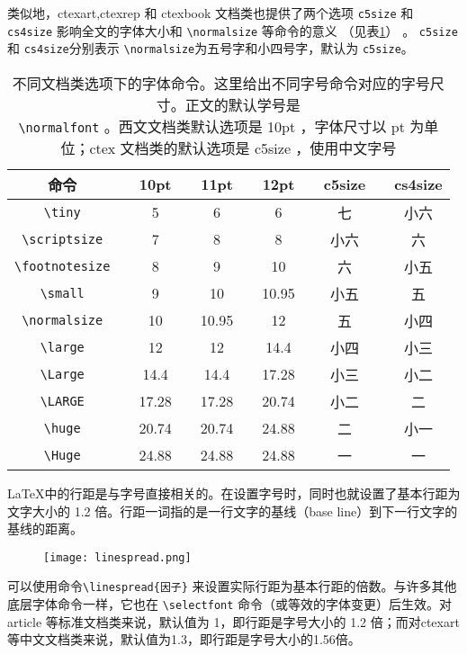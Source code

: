 类似地，ctexart,ctexrep 和 ctexbook 文档类也提供了两个选项 \verb|c5size| 和 \verb|cs4size| 影响全文的字体大小和 \verb|\normalsize| 等命令的意义 （见表\ref{tab:size}） 。 \verb|c5size| 和 \verb|cs4size|分别表示 \verb|\normalsize|为五号字和小四号字，默认为 \verb|c5size|。

\begin{table}[h]
    \centering
    \caption{不同文档类选项下的字体命令。这里给出不同字号命令对应的字号尺寸。正文的默认学号是\\ \lstinline{\normalfont} 。西文文档类默认选项是 10pt ，字体尺寸以 pt 为单位；ctex 文档类的默认选项是 c5size ，使用中文字号}
    \linespread{1.4}
    \selectfont
    \label{tab:size}
    \begin{tabular}{ccccccccccc}
        \toprule 
        命令 && 10pt && 11pt && 12pt && c5size && cs4size \\ 
        \midrule 
        \verb|\tiny| && 5 && 6 && 6 && 七 && 小六 \\
        \verb|\scriptsize| && 7 && 8 && 8 && 小六 && 六 \\
        \verb|\footnotesize| && 8 && 9 && 10 && 六 && 小五 \\ 
        \verb|\small| && 9 && 10 && 10.95 && 小五 && 五 \\
        \verb|\normalsize| && 10 && 10.95 && 12 && 五 &&小四 \\
        \verb|\large| && 12 && 12 && 14.4 && 小四 && 小三 \\
        \verb|\Large| && 14.4 && 14.4 && 17.28 && 小三 && 小二 \\
        \verb|\LARGE| && 17.28 && 17.28 && 20.74 && 小二&& 二 \\
        \verb|\huge| && 20.74 && 20.74 && 24.88 && 二 && 小一 \\
        \verb|\Huge| && 24.88 && 24.88 && 24.88 && 一 && 一 \\
        \bottomrule
    \end{tabular}
\end{table}
\LaTeX 中的行距是与字号直接相关的。在设置字号时，同时也就设置了基本行距为文字大小的 1.2 倍。行距一词指的是一行文字的基线（base line）到下一行文字的基线的距离。

\begin{figure}[H]
    \centering
    \texttt{[image: linespread.png]}
\end{figure}

可以使用命令\verb|\linespread{因子}| 来设置实际行距为基本行距的倍数。与许多其他底层字体命令一样，它也在 \verb|\selectfont| 命令（或等效的字体变更）后生效。对 article 等标准文档类来说，默认值为 1，即行距是字号大小的 1.2 倍；而对ctexart等中文文档类来说，默认值为1.3，即行距是字号大小的1.56倍。

